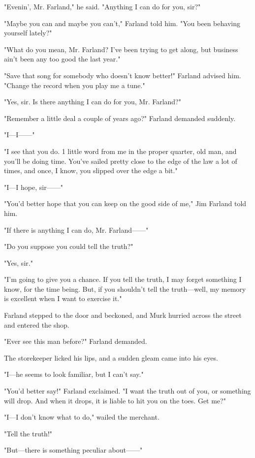 \documentclass{novel}
\begin{document}
"Evenin', Mr. Farland," he said. "Anything I can do for you, sir?"

"Maybe you can and maybe you can't," Farland told him. "You been behaving yourself lately?"

"What do you mean, Mr. Farland? I've been trying to get along, but business ain't been any too good the last year."

"Save that song for somebody who doesn't know better!" Farland advised him. "Change the record when you play me a tune."

"Yes, sir. Is there anything I can do for you, Mr. Farland?"

"Remember a little deal a couple of years ago?" Farland demanded suddenly.

"I---I------"

"I see that you do. 1 little word from me in the proper quarter, old man, and you'll be doing time. You've sailed pretty close to the edge of the law a lot of times, and once, I know, you slipped over the edge a bit."

"I---I hope, sir------"

"You'd better hope that you can keep on the good side of me," Jim Farland told him.

"If there is anything I can do, Mr. Farland------"

"Do you suppose you could tell the truth?"

"Yes, sir."

"I'm going to give you a chance. If you tell the truth, I may forget something I know, for the time being. But, if you shouldn't tell the truth---well, my memory is excellent when I want to exercise it."

Farland stepped to the door and beckoned, and Murk hurried across the street and entered the shop.

"Ever see this man before?" Farland demanded.

The storekeeper licked his lips, and a sudden gleam came into his eyes.

"I---he seems to look familiar, but I can't say."

"You'd better say!" Farland exclaimed. "I want the truth out of you, or something will drop. And when it drops, it is liable to hit you on the toes. Get me?"

"I---I don't know what to do," wailed the merchant.

"Tell the truth!"

"But---there is something peculiar about------"
\end{document}
